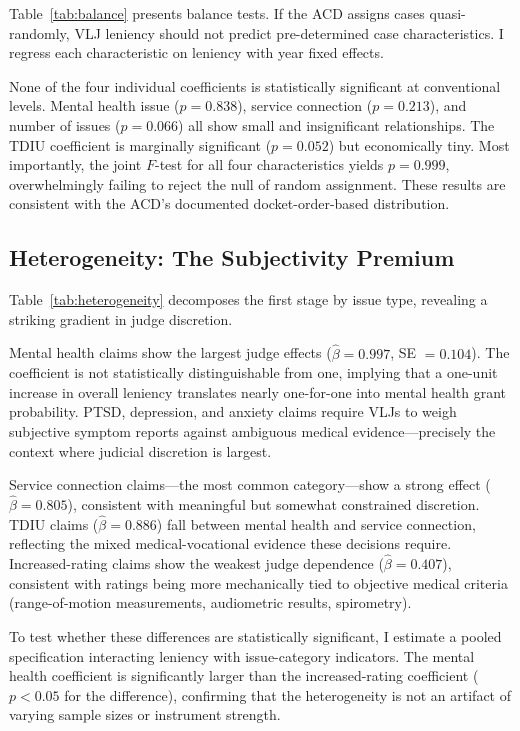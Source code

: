 \documentclass[12pt]{article}
\begin{document}
Table~\ref{tab:balance} presents balance tests. If the ACD assigns cases quasi-randomly, VLJ leniency should not predict pre-determined case characteristics. I regress each characteristic on leniency with year fixed effects.



None of the four individual coefficients is statistically significant at conventional levels. Mental health issue ($p = 0.838$), service connection ($p = 0.213$), and number of issues ($p = 0.066$) all show small and insignificant relationships. The TDIU coefficient is marginally significant ($p = 0.052$) but economically tiny. Most importantly, the joint $F$-test for all four characteristics yields $p = 0.999$, overwhelmingly failing to reject the null of random assignment. These results are consistent with the ACD's documented docket-order-based distribution.


\subsection{Heterogeneity: The Subjectivity Premium}

Table~\ref{tab:heterogeneity} decomposes the first stage by issue type, revealing a striking gradient in judge discretion.



Mental health claims show the largest judge effects ($\hat{\beta} = 0.997$, SE $= 0.104$). The coefficient is not statistically distinguishable from one, implying that a one-unit increase in overall leniency translates nearly one-for-one into mental health grant probability. PTSD, depression, and anxiety claims require VLJs to weigh subjective symptom reports against ambiguous medical evidence---precisely the context where judicial discretion is largest.

Service connection claims---the most common category---show a strong effect ($\hat{\beta} = 0.805$), consistent with meaningful but somewhat constrained discretion. TDIU claims ($\hat{\beta} = 0.886$) fall between mental health and service connection, reflecting the mixed medical-vocational evidence these decisions require. Increased-rating claims show the weakest judge dependence ($\hat{\beta} = 0.407$), consistent with ratings being more mechanically tied to objective medical criteria (range-of-motion measurements, audiometric results, spirometry).

To test whether these differences are statistically significant, I estimate a pooled specification interacting leniency with issue-category indicators. The mental health coefficient is significantly larger than the increased-rating coefficient ($p < 0.05$ for the difference), confirming that the heterogeneity is not an artifact of varying sample sizes or instrument strength.
\end{document}
